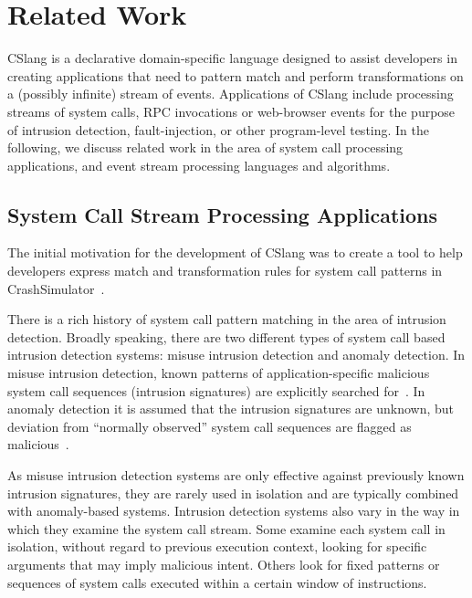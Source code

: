 \section{Related Work}
\label{SEC:related-work}

CSlang is a declarative domain-specific language designed to
assist developers in creating
applications that need to pattern match and perform
transformations on a (possibly infinite) stream of events.
Applications
of CSlang include
processing streams of system calls, RPC invocations or
web-browser events for the purpose of intrusion detection, fault-injection, or
other program-level testing. In the following, we discuss
related work in the area of system call processing applications,
and event stream processing languages and algorithms.

\subsection{System Call Stream Processing Applications}
The
initial motivation for the development of CSlang was to create a tool to help
developers express match and transformation rules for system call patterns in
CrashSimulator~\cite{DBLP:conf/issre/MooreCFW19}.

There is a rich history of system call pattern
matching in the area of intrusion detection.  Broadly speaking, there are two
different types of system call based intrusion detection systems: misuse
intrusion detection and anomaly detection. In misuse intrusion
detection, known patterns of application-specific malicious system call
sequences (intrusion signatures) are explicitly searched
for~\cite{GARCIATEODORO200918}.
In anomaly
detection it is assumed that the intrusion signatures are unknown, but deviation
from “normally observed” system call sequences are flagged as
malicious~\cite{DBLP:conf/sp/ForrestHSL96}.

As misuse intrusion detection systems are only
effective against previously known intrusion signatures, they are rarely used in
isolation and are typically combined with anomaly-based systems.
Intrusion
detection systems also vary in the way in which they examine the system call
stream.
Some examine each system call in isolation,
without regard to previous
execution context,
looking for specific arguments that may imply malicious
intent.
Others look for fixed patterns or sequences of system calls executed
within a certain window of instructions.

